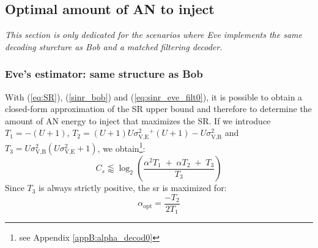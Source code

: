 \subsection{Optimal amount of AN to inject}
\label{subsec:best_alpha}
\textit{This section is only dedicated for the scenarios where Eve implements the same decoding sturcture as Bob and a matched filtering decoder.}

\subsubsection{Eve's estimator: same structure as Bob}
With (\ref{eq:SR}), (\ref{sinr_bob}) and (\ref{eq:sinr_eve_filt0}), it is possible to obtain a closed-form approximation of the SR upper bound and therefore to determine the amount of AN energy to inject that maximizes the SR. If we introduce $T_1=-(U+1)$,  $T_2 = (U+1)U\sigma_{\text{V,E}}^2^ + (U+1) - U\sigma_{\text{V,B}}^2 $ and $T_3 = U\sigma_{\text{V,B}}^2(U\sigma_{\text{V,E}}^2+1)$, we obtain\footnote{see Appendix \ref{appB:alpha_decod0}}:
\begin{equation}
C_s \lessapprox \log_2 \left( \frac{\alpha^2 T_1 \; + \; \alpha T_2 \; + \; T_3}{T_3} \right)
\label{eq:SR_anal2_decod_0}
\end{equation}
Since $T_3$ is always strictly positive, the \gls{sr} is maximized for:
\begin{equation}
	\alpha_{\text{opt}} = \frac{-T_2}{2T_1}
	\label{eq:optimal_alpha_decod_0}
\end{equation}




